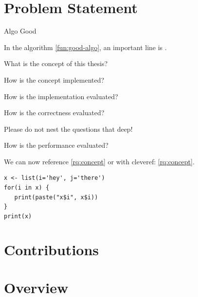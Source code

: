 \section{Problem Statement}

\begin{pseudo}[tbp]
	\caption{Algo Good}
	\label{fun:good-algo}
	\begin{algorithm}[H]
		\PreCode
		
		\StartCode
	\end{algorithm}
\end{pseudo}

In the  algorithm \cref{fun:good-algo}, an important line is .

\begin{rqs}
   \item \label{rq:concept} What is the concept of this thesis?
   \item \label{rq:implementation} How is the concept implemented?
   \item \label{rq:evaluation} How is the implementation evaluated?
   \begin{rqs}
      \item \label{rq:evaluation:correctness} How is the correctness evaluated? \begin{rqs}
         \item Please do not nest the questions that deep!
      \end{rqs}
      \item \label{rq:evaluation:performance} How is the performance evaluated?
   \end{rqs}
\end{rqs}

We can now reference \ref{rq:concept} or with cleveref: \cref{rq:concept}.


\begin{verbatim}
x <- list(i='hey', j='there')
for(i in x) {
   print(paste("x$i", x$i))
}
print(x)
\end{verbatim}

\section{Contributions}

\section{Overview}